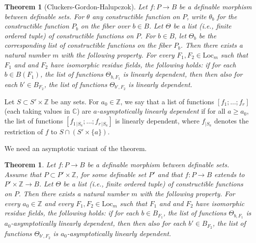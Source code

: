 \documentclass[12pt]{amsart}
\newcommand{\ring}[1]{{\mathbb #1}}
\newcommand{\Loc}{\mathrm{Loc}}
\theoremstyle{plain}
\newtheorem{theorem}[thm]{Theorem}
\theoremstyle{definition}
\begin{document}
\begin{theorem}[Cluckers-Gordon-Halupczok]\label{thm:cgh}
Let $f:P\to B$ be a definable morphism between
  definable sets.  For $\theta$ any constructible function on $P$, write
  $\theta_{b}$ for the constructible function $P_b$ on the fiber over $b\in
  B$.  Let $\Theta$ be a list (i.e., finite ordered tuple) of constructible
  functions on $P$. For $b\in B$, let $\Theta_b$ be the corresponding list
  of constructible functions on the fiber $P_b$.  Then there exists a
  natural number $m$ with the following property.  For every $F_1,F_2 \in
  \Loc_{m}$ such that $F_1$ and and $F_2$ have isomorphic residue
  fields, the following holds: if for each $b\in B({F_1})$, the list of
  functions $\Theta_{b,F_1}$ is linearly dependent, then then also for each
  $b'\in B_{F_2}$, the list of functions $\Theta_{b',F_2}$ is linearly
  dependent.
\end{theorem}

Let $S \subset S'\times\ring{Z}$ be any sets.  For $a_0\in\ring{Z}$,
we say that a list of functions $[f_1;\ldots;f_r]$ (each taking values
in $\ring{C}$) are {\it $a$-asymptotically linearly dependent} if for all $a\ge
a_0$, the list of functions $[f_{1\,|S_a};\ldots;f_{r\,|S_a}]$ is
linearly dependent, where $f_{|S_a}$ denotes the restriction of $f$ to
$S\cap (S'\times\{a\})$.

We need an asymptotic variant of the theorem.


\begin{theorem}\label{thm:cgh-asymp}
Let $f:P\to B$ be a definable morphism between
  definable sets.   Assume that $P\subset P'\times\ring{Z}$, for some
  definable set $P'$ and that $f:P\to B$ extends to
  $P'\times\ring{Z}\to B$.  Let $\Theta$ be a list (i.e., finite ordered tuple) of constructible
  functions on $P$.   Then there exists a
  natural number $m$ with the following property.  For every
  $a_0\in\ring{Z}$ and every $F_1,F_2 \in
  \Loc_{m}$ such that $F_1$ and and $F_2$ have isomorphic residue
  fields, the following holds: if for each $b\in B_{F_1}$, the list of
  functions $\Theta_{b,F_1}$ is $a_0$-asymptotically linearly dependent, then then also for each
  $b'\in B_{F_2}$, the list of functions $\Theta_{b',F_2}$ is $a_0$-asymptotically linearly
  dependent.
\end{theorem}
\end{document}
